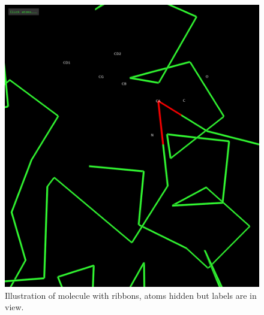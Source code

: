 \documentclass[11pt]{article}
\begin{document}
\begin{figure}[htbp]
\centering
\includegraphics[width=.9\linewidth]{./ribbons.png}
\caption{Illustration of molecule with ribbons, atoms hidden but labels are in view.}
\end{figure}
\end{document}
